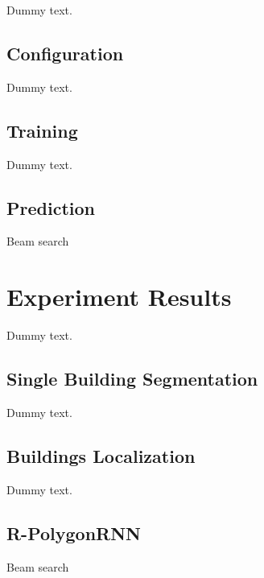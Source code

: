 Dummy text.

\subsection{Configuration}

Dummy text.

\subsection{Training}

Dummy text.

\subsection{Prediction}

Beam search

\section{Experiment Results}\label{er}

Dummy text.

\subsection{Single Building Segmentation}

Dummy text.

\subsection{Buildings Localization}

Dummy text.

\subsection{R-PolygonRNN}

Beam search
